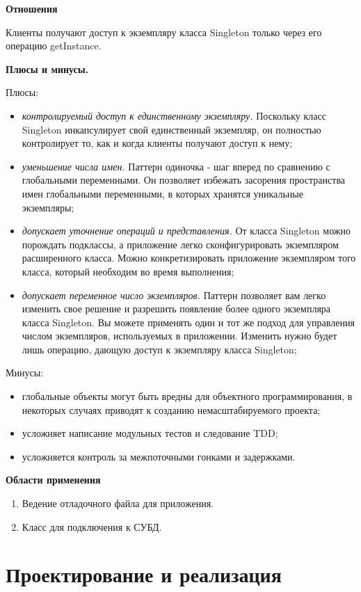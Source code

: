 \documentclass[PI,LAB]{HSEUniversity}
\begin{document}
\textbf{Отношения}

Клиенты получают доступ к экземпляру класса Singleton только через его операцию getInstance.

\textbf{Плюсы и минусы.}

Плюсы:
\begin{itemize}
  \item \textit{контролируемый доступ к единственному экземпляру.} Поскольку класс Singleton инкапсулирует свой единственный экземпляр, он полностью контролирует то, как и когда клиенты получают доступ к нему;
  \item \textit{уменьшение числа имен.} Паттерн одиночка - шаг вперед по сравнению с глобальными переменными. Он позволяет избежать засорения пространства имен глобальными переменными, в которых хранятся уникальные экземпляры;
  \item \textit{допускает уточнение операций и представления.} От класса Singleton можно порождать подклассы, а приложение легко сконфигурировать экземпляром расширенного класса. Можно конкретизировать приложение экземпляром того класса, который необходим во время выполнения;
  \item \textit{допускает переменное число экземпляров.} Паттерн позволяет вам легко изменить свое решение и разрешить появление более одного экземпляра класса Singleton. Вы можете применять один и тот же подход для управления числом экземпляров, используемых в приложении. Изменить нужно будет лишь операцию, дающую доступ к экземпляру класса Singleton;
\end{itemize}
Минусы:
\begin{itemize}
  \item глобальные объекты могут быть вредны для объектного программирования, в некоторых случаях приводят к созданию немасштабируемого проекта;
  \item усложняет написание модульных тестов и следование TDD;
  \item усложняется контроль за межпоточными гонками и задержками.
\end{itemize}

\textbf{Области применения}

\begin{enumerate}
  \item Ведение отладочного файла для приложения.
  \item Класс для подключения к СУБД.
\end{enumerate}

\chapter{Проектирование и реализация}
\end{document}
